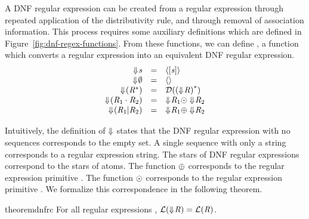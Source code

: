 \documentclass[numbers,10pt,preprint\ifanon ,nocopyrightspace\fi]{sigplanconf}
\begin{document}
A DNF regular expression can be created from a regular expression through repeated
application of the distributivity rule, and through removal of association
information.
This process requires some auxiliary definitions
which are defined in Figure~\ref{fig:dnf-regex-functions}.
From these functions, we can define \ToDNFRegex{}, a function which converts a regular expression into
an equivalent DNF regular expression.
\[
  \begin{array}{rcl}
    \ToDNFRegexOf{\String} & = & \DNFOf{\SequenceOf{\String}}\\
    \ToDNFRegexOf{\emptyset} & = & \DNFOf{}\\
    \ToDNFRegexOf{(\StarOf{\Regex})} & = & \AtomToDNFOf{\StarOf{(\ToDNFRegexOf{\Regex})}}\\
    \ToDNFRegexOf{(\RegexConcat{\Regex_1}{\Regex_2})} & = & \ToDNFRegexOf{\Regex_1} \ConcatDNF \ToDNFRegexOf{\Regex_2}\\
    \ToDNFRegexOf{(\RegexOr{\Regex_1}{\Regex_2})} & = & \ToDNFRegexOf{\Regex_1} \OrDNF \ToDNFRegexOf{\Regex_2}\\
  \end{array}
\]

Intuitively, the definition of $\Downarrow$ states that the DNF regular
expression with no sequences
corresponds to the empty set.  A single sequence with only a string corresponds
to a \BaseRegexType{} regular expression string.
The stars of DNF regular expressions correspond to the stars
of atoms.  The function $\oplus$ corresponds to the regular expression
primitive \OrRegexType{}.  The function $\odot$ corresponds to the regular
expression primitive \ConcatRegexType{}.  We formalize this correspondence
in the following theorem.

\begin{restatable}{theorem}{dnfrc}
  \label{thm:completeness-dnf-lenses}
  For all regular expressions \Regex{},
  $\mathcal{L}(\Downarrow\mkern-4mu \mathit{R})=\mathcal{L}(\mathit{R}{})$.
\end{restatable}
\end{document}
